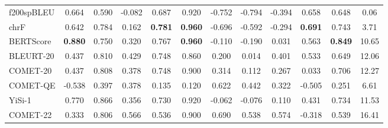 \documentclass[11pt]{article}
\begin{document}
\begin{sidewaystable*}[ht]
\begin{tabular}{@{}lccccccccccc@{}}
f200spBLEU              & \phantom{-}0.664    & \phantom{-}0.590    & -0.082         & \phantom{-}0.687        & \phantom{-}0.920            & -0.752          & -0.794           & -0.394               & \phantom{-}0.658          & \phantom{-}0.648       & \phantom{-}0.06       \\
chrF                    & \phantom{-}0.642    & \phantom{-}0.784    & \phantom{-}0.162          & \colorbox[HTML]{B2EAB1}{\textbf{\phantom{-}0.781}}        & \colorbox[HTML]{B2EAB1}{\textbf{\phantom{-}0.960}}            & -0.696          & -0.592           & -0.294               & \colorbox[HTML]{B2EAB1}{\textbf{\phantom{-}0.691}}          & \phantom{-}0.743       & \phantom{1}3.71       \\
BERTScore               & \colorbox[HTML]{B2EAB1}{\textbf{\phantom{-}0.880}}    & \phantom{-}0.750    & \phantom{-}0.320          & \phantom{-}0.767        & \colorbox[HTML]{B2EAB1}{\textbf{\phantom{-}0.960}}            & -0.110          & -0.190           & \phantom{-}0.031                & \phantom{-}0.563          & \colorbox[HTML]{B2EAB1}{\textbf{\phantom{-}0.849}}       & 10.65      \\
BLEURT-20               & \phantom{-}0.437    & \phantom{-}0.810    & \phantom{-}0.429          & \phantom{-}0.748        & \phantom{-}0.860            & \phantom{-}0.200           & \phantom{-}0.014            & \phantom{-}0.401                & \phantom{-}0.533          & \phantom{-}0.649       & 12.06      \\
COMET-20                & \phantom{-}0.437    & \phantom{-}0.808    & \phantom{-}0.378          & \phantom{-}0.748        & \phantom{-}0.900            & \phantom{-}0.314           & \phantom{-}0.112            & \phantom{-}0.267                & \phantom{-}0.033          & \phantom{-}0.706       & 12.27      \\
COMET-QE                & -0.538   & \phantom{-}0.397    & \phantom{-}0.378          & \phantom{-}0.135        & \phantom{-}0.120            & \phantom{-}0.622           & \phantom{-}0.442            & \phantom{-}0.322                & -0.505         & \phantom{-}0.251       & \phantom{1}6.61       \\
YiSi-1                  & \phantom{-}0.770    & \phantom{-}0.866    & \phantom{-}0.356          & \phantom{-}0.730        & \phantom{-}0.920            & -0.062          & -0.076           & \phantom{-}0.110                & \phantom{-}0.431          & \phantom{-}0.734       & 11.53      \\
\midrule
COMET-22                & \phantom{-}0.333    & \phantom{-}0.806    & \phantom{-}0.566          & \phantom{-}0.536        & \phantom{-}0.900            & \phantom{-}0.690           & \phantom{-}0.538            & \phantom{-}0.574                & -0.318         & \phantom{-}0.539       & 16.41      \\

\end{tabular}
\end{sidewaystable*}
\end{document}

